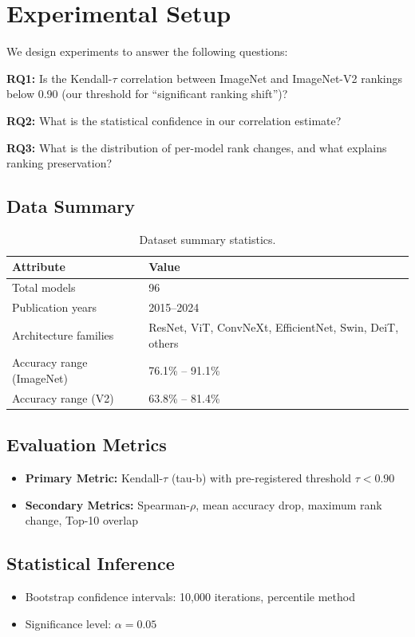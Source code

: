 \section{Experimental Setup}
\label{sec:experiments}

We design experiments to answer the following questions:

\textbf{RQ1:} Is the Kendall-$\tau$ correlation between ImageNet and ImageNet-V2 rankings below 0.90 (our threshold for ``significant ranking shift'')?

\textbf{RQ2:} What is the statistical confidence in our correlation estimate?

\textbf{RQ3:} What is the distribution of per-model rank changes, and what explains ranking preservation?

\subsection{Data Summary}

\begin{table}[h]
\centering
\begin{tabular}{ll}
\toprule
\textbf{Attribute} & \textbf{Value} \\
\midrule
Total models & 96 \\
Publication years & 2015--2024 \\
Architecture families & ResNet, ViT, ConvNeXt, EfficientNet, Swin, DeiT, others \\
Accuracy range (ImageNet) & 76.1\% -- 91.1\% \\
Accuracy range (V2) & 63.8\% -- 81.4\% \\
\bottomrule
\end{tabular}
\caption{Dataset summary statistics.}
\label{tab:data_summary}
\end{table}

\subsection{Evaluation Metrics}

\begin{itemize}
    \item \textbf{Primary Metric:} Kendall-$\tau$ (tau-b) with pre-registered threshold $\tau < 0.90$
    \item \textbf{Secondary Metrics:} Spearman-$\rho$, mean accuracy drop, maximum rank change, Top-10 overlap
\end{itemize}

\subsection{Statistical Inference}

\begin{itemize}
    \item Bootstrap confidence intervals: 10,000 iterations, percentile method
    \item Significance level: $\alpha = 0.05$
\end{itemize}
